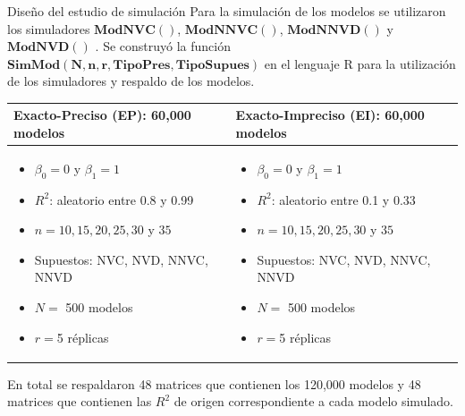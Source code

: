 \documentclass[serif, aspectratio=169]{beamer}
\begin{document}
\begin{frame}{Diseño del estudio de simulación}
Para la simulación de los modelos se utilizaron los simuladores $\mathbf{ModNVC()}$, $\mathbf{ModNNVC()}$, $\mathbf{ModNNVD()}$ y $\mathbf{ModNVD()}$ \parencites{febles-2014, zacarias-2023}. Se construyó la función $\mathbf{SimMod(N,n,r,TipoPres,TipoSupues)}$ en el lenguaje R para la utilización de los simuladores y respaldo de los modelos.
\vspace{.1cm}

		
		\begin{table}[h!]
			\renewcommand{\arraystretch}{0.9} %
			\scriptsize %
			\begin{tabular}{|p{5cm}|p{5cm}|} %
				\hline
				\textbf{Exacto-Preciso (EP): 60,000 modelos} & \textbf{Exacto-Impreciso (EI): 60,000 modelos} \\ \hline
				
				
				\begin{itemize}
					\item $\beta_0 = 0$ y $\beta_1 = 1$
					\item $R^2$: aleatorio entre 0.8 y 0.99
					\item $n = 10, 15, 20, 25, 30$ y $35$
					\item Supuestos: NVC, NVD, NNVC, NNVD
					\item $N=$ 500 modelos
					\item $r=$5 réplicas
				\end{itemize}
				 &
				  	
				 \begin{itemize}
				 	\item $\beta_0 = 0$ y $\beta_1 = 1$
				 	\item $R^2$: aleatorio entre 0.1 y 0.33
				 	\item $n = 10, 15, 20, 25, 30$ y $35$
				 	\item Supuestos: NVC, NVD, NNVC, NNVD
					\item $N=$ 500 modelos
					\item $r=$5 réplicas
				 \end{itemize}
				 
				 \\ \hline
			\end{tabular}
		\end{table}
		
		
		En total se respaldaron 48 matrices que contienen los 120,000 modelos y 48 matrices que contienen las $R^2$ de origen correspondiente a cada modelo simulado.
		
\end{frame}
\end{document}
